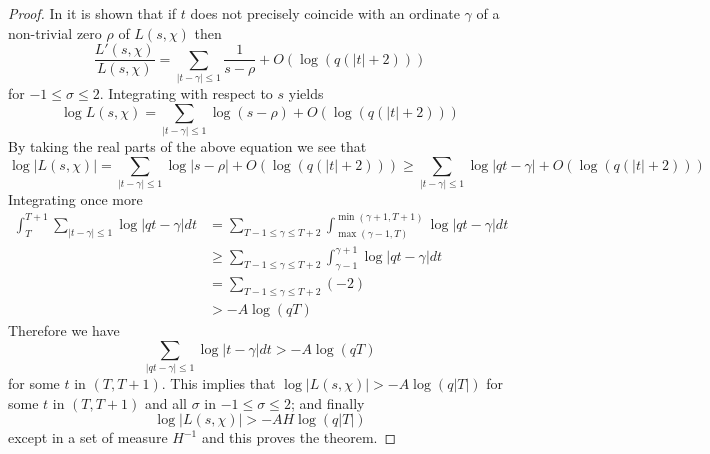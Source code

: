 \documentclass[11pt]{article}
\numberwithin{equation}{section}		 			%
\numberwithin{figure}{section}			 			%
\begin{document}
\begin{proof}
In \cite{davenport} it is shown that if $t$ does not precisely coincide with an ordinate $\gamma$ of a non-trivial zero $\rho$ of $L(s,\chi)$ then
\[
\frac{{L'(s,\chi )}}{{L(s,\chi )}} = \sum\limits_{\left| {t - \gamma } \right| \leqslant 1} {\frac{1}{{s - \rho }}}  + O(\log (q(\left| t \right| + 2)))
\]
for $-1 \le \sigma \le 2$. Integrating with respect to $s$ yields
\[
\log L(s,\chi ) = \sum\limits_{\left| {t - \gamma } \right| \leqslant 1} {\log (s - \rho )}  + O(\log (q(\left| t \right| + 2)))
\]
By taking the real parts of the above equation we see that
\[
\log \left| {L(s,\chi )} \right| = \sum\limits_{\left| {t - \gamma } \right| \leqslant 1} {\log \left| {s - \rho } \right|}  + O(\log (q(\left| t \right| + 2))) \geqslant \sum\limits_{\left| {t - \gamma } \right| \leqslant 1} {\log \left| {qt - \gamma } \right|}  + O(\log (q(\left| t \right| + 2)))
\]
Integrating once more
\begin{align}
  \int_T^{T + 1} {\sum\limits_{\left| {t - \gamma } \right| \leqslant 1} {\log \left| {qt - \gamma } \right|} dt}  &= \sum\limits_{T - 1 \leqslant \gamma  \leqslant T + 2} {\int_{\max (\gamma  - 1,T)}^{\min (\gamma  + 1,T + 1)} {\log \left| {qt - \gamma } \right|dt} }  \nonumber \\
   &\ge \sum\limits_{T - 1 \leqslant \gamma  \leqslant T + 2} {\int_{\gamma  - 1}^{\gamma  + 1} {\log \left| {qt - \gamma } \right|dt} }  \nonumber \\
   &= \sum\limits_{T - 1 \leqslant \gamma  \leqslant T + 2} {( - 2)}  \nonumber \\
   &>  - A\log (qT) \nonumber 
\end{align}
Therefore we have
\[
\sum\limits_{\left| {qt - \gamma } \right| \leqslant 1} {\log \left| {t - \gamma } \right|} dt >  - A\log (qT)
\]
for some $t$ in $(T,T+1)$. This implies that $\log \left| {L(s,\chi )} \right| >  - A\log (q\left| T \right|)$ for some $t$ in $(T,T+1)$ and all $\sigma$ in $-1 \le \sigma \le 2$; and finally
\[
\log \left| {L(s,\chi )} \right| >  - AH\log (q\left| T \right|)
\]
except in a set of measure $H^{-1}$ and this proves the theorem.
\end{proof}
\end{document}
